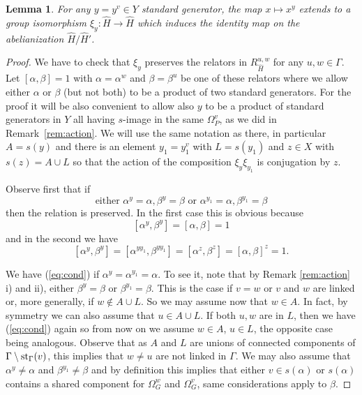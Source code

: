 \documentclass[10pt]{amsart}
\newtheorem{lemma}[theorem]{Lemma}
\theoremstyle{definition}
\newcommand{\st}{{\rm st}}
\theoremstyle{definition}
\numberwithin{equation}{section}
\begin{document}
\begin{lemma}\label{lem:welldef1} For any $y=y^v\in Y$ standard generator, the map $x\mapsto x^y$ extends to a group isomorphism $\xi_y \colon \hat H\to\hat H$ which induces the identity map on the abelianization $\hat H/\hat H'$.
\end{lemma}
\begin{proof} We have to check that $\xi_y$ preserves the relators in $R_{\hat H}^{u,w}$ for any $u,w\in\Gamma$. Let $[\alpha,\beta]=1$ with $\alpha=\alpha^w$ and $\beta=\beta^u$ be one of these relators where we allow either $\alpha$ or $\beta$ (but not both) to be a product of two standard generators. For the proof it will be also convenient to allow also $y$ to be  a product of standard generators in $Y$ all having $s$-image in the same $\Omega_P^v$, as we did in Remark~\ref{rem:action}. We will use the same notation as there, in particular $A=s(y)$ and there is an element $y_1=y_1^v$ with $L=s(y_1)$ and $z\in X$ with $s(z)=A\cup L$ so that the action of the composition $\xi_y\xi_{y_1}$ is conjugation by $z$.

Observe first that if 
\begin{equation}\label{eq:cond}
\text{either }\alpha^y=\alpha,\beta^y=\beta\text{ or }\alpha^{y_1}=\alpha,\beta^{y_1}=\beta
\end{equation}
then the relation is preserved. In the first case this is obvious because
\[[\alpha^y,\beta^y]=[\alpha,\beta]=1\]
and in the second we have
\[[\alpha^y,\beta^y]=[\alpha^{yy_1},\beta^{yy_1}]=[\alpha^{z},\beta^{z}]=[\alpha,\beta]^z=1.\]

We have (\ref{eq:cond}) if $\alpha^y=\alpha^{y_1}=\alpha$. To see it, note that by Remark \ref{rem:action} i) and ii), either $\beta^y=\beta$ or $\beta^{y_1}=\beta$. %
This is the case if $v=w$ or $v$ and $w$ are linked or, more generally, if $w\not\in A\cup L$. So we may assume now that $w\in A$. In fact, by symmetry we can also assume that $u\in A\cup L$. If both $u,w$ are in $L$, then we have (\ref{eq:cond}) again so from now on we assume $w\in A$, $u\in L$, the opposite case being analogous. Observe that as $A$ and $L$ are unions of connected components of $\Gamma\setminus\st_\Gamma(v)$, this implies that $w\neq u$ are not linked in $\Gamma$. We may also assume that $\alpha^y\neq \alpha$ and $\beta^{y_1}\neq\beta$ and by definition this implies that either $v\in s(\alpha)$ or $s(\alpha)$ contains a shared component for $\Omega_G^w$ and $\Omega_G^v$, same considerations apply to $\beta$.


\end{proof}
\end{document}
